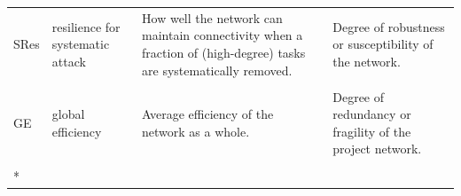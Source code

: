 \documentclass[preprint,
3p]{elsarticle} %
\begin{document}
\begin{appendices}
\begin{longtable}[t]{l>{\raggedright\arraybackslash}p{2.2cm}>{\raggedright\arraybackslash}p{3.8cm}>{\raggedright\arraybackslash}p{4.2cm}}
SRes & resilience for systematic attack & How well the network can maintain connectivity when a fraction of (high-degree) tasks are systematically removed. & Degree of robustness or susceptibility of the network.\\
\cellcolor{gray!10}{ALE} & \cellcolor{gray!10}{average local efficiency} & \cellcolor{gray!10}{Average efficiency of the subgraphs induced by the dependencies of each task in the project network.} & \cellcolor{gray!10}{Degree of redundancy or fragility of the project network.}\\
GE & global efficiency & Average efficiency of the network as a whole. & Degree of redundancy or fragility of the project network.\\
\cellcolor{gray!10}{Tra} & \cellcolor{gray!10}{graph transitivity} & \cellcolor{gray!10}{Ratio of ratio of triangles to triplets in an project network.} & \cellcolor{gray!10}{Degree of cliquishness or openness of the project network.}\\*
\end{longtable}
\endgroup{}


\end{appendices}
\end{document}
